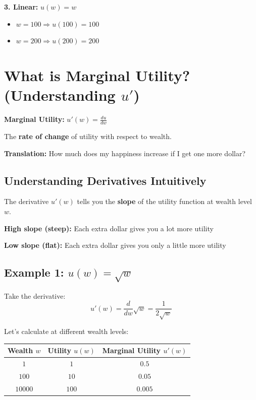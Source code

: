 \documentclass[12pt]{article}
\begin{document}
\textbf{3. Linear:} $u(w) = w$

\begin{itemize}
    \item $w = 100 \Rightarrow u(100) = 100$
    \item $w = 200 \Rightarrow u(200) = 200$
\end{itemize}

\newpage

\section*{What is Marginal Utility? (Understanding $u'$)}

\begin{center}
\colorbox{green!20}{
\begin{minipage}{0.9\textwidth}
\textbf{Marginal Utility:} $u'(w) = \frac{du}{dw}$

The \textbf{rate of change} of utility with respect to wealth.

\textbf{Translation:} How much does my happiness increase if I get one more dollar?
\end{minipage}
}
\end{center}

\subsection*{Understanding Derivatives Intuitively}

The derivative $u'(w)$ tells you the \textbf{slope} of the utility function at wealth level $w$.

\textbf{High slope (steep):} Each extra dollar gives you a lot more utility

\textbf{Low slope (flat):} Each extra dollar gives you only a little more utility

\subsection*{Example 1: $u(w) = \sqrt{w}$}

Take the derivative:
$$u'(w) = \frac{d}{dw}\sqrt{w} = \frac{1}{2\sqrt{w}}$$

Let's calculate at different wealth levels:

\begin{center}
\begin{tabular}{|c|c|c|}
\hline
\textbf{Wealth $w$} & \textbf{Utility $u(w)$} & \textbf{Marginal Utility $u'(w)$} \\
\hline
$1$ & $1$ & $0.5$ \\
\hline
$100$ & $10$ & $0.05$ \\
\hline
$10000$ & $100$ & $0.005$ \\
\hline
\end{tabular}
\end{center}
\end{document}
